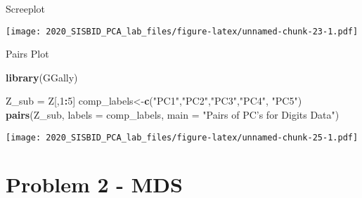 \documentclass[
]{article}
\newenvironment{Shaded}{\begin{snugshade}}{\end{snugshade}}
\newcommand{\DataTypeTok}[1]{\textcolor[rgb]{0.13,0.29,0.53}{#1}}
\newcommand{\DecValTok}[1]{\textcolor[rgb]{0.00,0.00,0.81}{#1}}
\newcommand{\KeywordTok}[1]{\textcolor[rgb]{0.13,0.29,0.53}{\textbf{#1}}}
\newcommand{\NormalTok}[1]{#1}
\newcommand{\OperatorTok}[1]{\textcolor[rgb]{0.81,0.36,0.00}{\textbf{#1}}}
\newcommand{\StringTok}[1]{\textcolor[rgb]{0.31,0.60,0.02}{#1}}
\begin{document}
Screeplot

\begin{Shaded}
\end{Shaded}

\texttt{[image: 2020\_SISBID\_PCA\_lab\_files/figure-latex/unnamed-chunk-23-1.pdf]}

Pairs Plot

\begin{Shaded}
\begin{Highlighting}[]
\KeywordTok{library}\NormalTok{(GGally)}
\end{Highlighting}
\end{Shaded}

\begin{Shaded}
\begin{Highlighting}[]
\NormalTok{Z_sub =}\StringTok{ }\NormalTok{Z[,}\DecValTok{1}\OperatorTok{:}\DecValTok{5}\NormalTok{]}
\NormalTok{comp_labels<-}\KeywordTok{c}\NormalTok{(}\StringTok{"PC1"}\NormalTok{,}\StringTok{"PC2"}\NormalTok{,}\StringTok{"PC3"}\NormalTok{,}\StringTok{"PC4"}\NormalTok{, }\StringTok{"PC5"}\NormalTok{)}
\KeywordTok{pairs}\NormalTok{(Z_sub, }\DataTypeTok{labels =}\NormalTok{ comp_labels, }\DataTypeTok{main =} \StringTok{"Pairs of PC's for Digits Data"}\NormalTok{)}
\end{Highlighting}
\end{Shaded}

\texttt{[image: 2020\_SISBID\_PCA\_lab\_files/figure-latex/unnamed-chunk-25-1.pdf]}

\hypertarget{problem-2---mds-1}{%
\section{Problem 2 - MDS}\label{problem-2---mds-1}}
\end{document}
